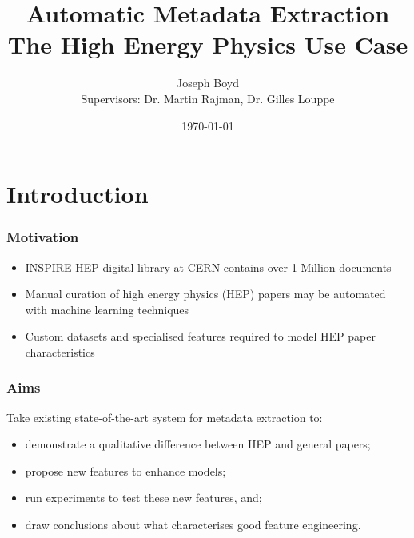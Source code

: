 \documentclass{beamer}
\title[Automatic Metadata Extraction]{Automatic Metadata Extraction \\ The High Energy Physics Use Case} %
\author{Joseph Boyd \\ Supervisors: Dr. Martin Rajman, Dr. Gilles Louppe} %
\institute[EPFL] %
{
\'Ecole Polytechnique F\'ed\'erale de Lausanne \\ %
\medskip
\textit{joseph.boyd@epfl.ch} %
}
\date{\today} %
\begin{document}
\begin{frame}
\titlepage %
\end{frame}


\section{Introduction}


\begin{frame}
\frametitle{Motivation}
\begin{itemize}
\item INSPIRE-HEP digital library at CERN contains over 1 Million documents
\item Manual curation of high energy physics (HEP) papers may be automated with machine learning techniques
\item Custom datasets and specialised features required to model HEP paper characteristics
\end{itemize}
\end{frame}


\begin{frame}
\frametitle{Aims}
Take existing state-of-the-art system for metadata extraction to:
\begin{itemize}
\item demonstrate a qualitative difference between HEP and general papers;
\item propose new features to enhance models;
\item run experiments to test these new features, and;
\item draw conclusions about what characterises good feature engineering.
\end{itemize}
\end{frame}

\end{document}
